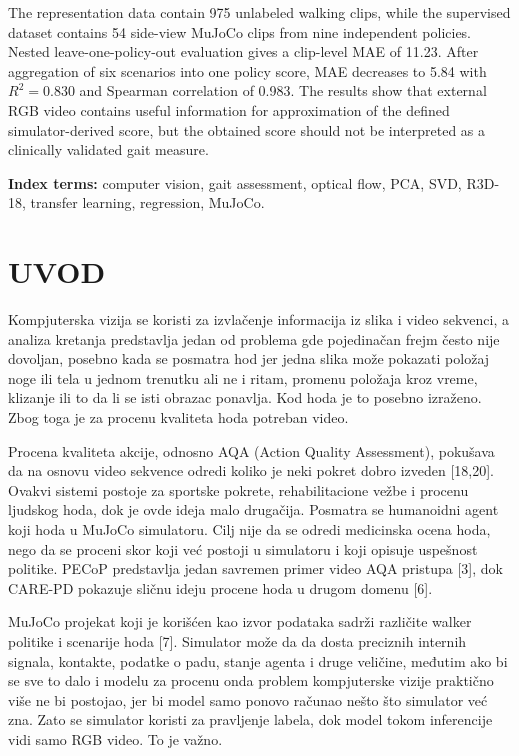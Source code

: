 \documentclass[12pt,a4paper]{report}
\begin{document}
The representation data contain 975 unlabeled walking clips, while the
supervised dataset contains 54 side-view MuJoCo clips from nine independent
policies. Nested leave-one-policy-out evaluation gives a clip-level MAE of
11.23. After aggregation of six scenarios into one policy score, MAE decreases
to 5.84 with $R^2=0.830$ and Spearman correlation of 0.983. The results show
that external RGB video contains useful information for approximation of the
defined simulator-derived score, but the obtained score should not be
interpreted as a clinically validated gait measure.

\noindent\textbf{Index terms:} computer vision, gait assessment, optical flow,
PCA, SVD, R3D-18, transfer learning, regression, MuJoCo.

\clearpage
\fi

\tableofcontents
\clearpage


\chapter{UVOD}

Kompjuterska vizija se koristi za izvla\v{c}enje informacija iz slika i video sekvenci, a
analiza kretanja predstavlja jedan od problema gde pojedinačan frejm često nije
dovoljan, posebno kada se posmatra hod jer jedna slika može pokazati položaj noge
ili tela u jednom trenutku ali ne i ritam, promenu položaja kroz vreme, klizanje
ili to da li se isti obrazac ponavlja. Kod hoda je to posebno izraženo. Zbog
toga je za procenu kvaliteta hoda potreban video.

Procena kvaliteta akcije, odnosno AQA (Action Quality Assessment), pokušava da
na osnovu video sekvence odredi koliko je neki pokret dobro izveden [18,20]. Ovakvi
sistemi postoje za sportske pokrete, rehabilitacione vežbe i procenu ljudskog
hoda, dok je ovde ideja malo drugačija. Posmatra se humanoidni agent koji hoda u
MuJoCo simulatoru. Cilj nije da se odredi medicinska ocena hoda, nego da se
proceni skor koji već postoji u simulatoru i koji opisuje uspešnost politike.
PECoP predstavlja jedan savremen primer video AQA pristupa [3], dok CARE-PD
pokazuje sličnu ideju procene hoda u drugom domenu [6].

MuJoCo projekat koji je korišćen kao izvor podataka sadrži različite walker
politike i scenarije hoda [7]. Simulator može da da dosta preciznih internih
signala, kontakte, podatke o padu, stanje agenta i druge veličine, međutim ako bi
se sve to dalo i modelu za procenu onda problem kompjuterske vizije praktično više
ne bi postojao, jer bi model samo ponovo računao nešto što simulator već zna.
Zato se simulator koristi za pravljenje labela, dok model tokom inferencije vidi
samo RGB video. To je važno.
\end{document}
